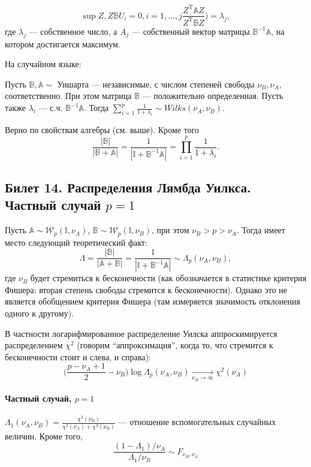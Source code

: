 %
\begin{equation*}
\sup \limits{Z, Z\mathbb{B}U_i = 0, i = 1,\dots, j}  \frac{Z^{\mathrm{T}}\mathbb{A}Z}{Z^{\mathrm{T}}\mathbb{B}Z} \Big) = \lambda_j,
\end{equation*}
%
где $\lambda_j$ --- собственное число, а $A_j$ --- собственный вектор матрицы $\mathbb{B}^{-1}\mathbb{A}$, на котором достигается максимум.

На случайном языке:
\begin{sug}
Пусть $\mathbb{B}, \mathbb{A} \sim$ Уишарта --- независимые, с числом степеней свободы $\nu_B, \nu_A$, соответственно. При этом матрица $\mathbb{B}$ --- положительно определенная. Пусть также $\lambda_i$ --- с.ч. $\mathbb{B}^{-1}\mathbb{A}$. 
Тогда $\sum \limits_{i = 1}^p \frac{1}{1 + \lambda_i} \sim Wilks(\nu_A, \nu_B)$.
\end{sug}
Верно по свойствам алгебры (см. выше). Кроме того
\begin{equation*}
\frac{|\mathbb{B}|}{|\mathbb{B} + \mathbb{A}|} = \frac{1}{|\mathbb{I} + \mathbb{B}^{-1}\mathbb{A}|} = \prod \limits_{i = 1}^p \frac{1}{1 + \lambda_i}.
\end{equation*}

\subsection{Билет 14. Распределения Лямбда Уилкса. Частный случай $p=1$}
Пусть $\mathbb{A} \sim \mathcal{W}_p (\mathbb{I},\nu_A)$, $\mathbb{B} \sim \mathcal{W}_p (\mathbb{I}, \nu_B)$, при этом $\nu_B > p > \nu_A$.
Тогда имеет место следующий теоретический факт:
%
\begin{equation*}
\Lambda = \frac{|\mathbb{B}|}{|\mathbb{A} + \mathbb{B}|} =\frac{1}{|\mathbb{I} + \mathbb{B}^{-1}\mathbb{A}|} \sim \Lambda_p (\nu_A, \nu_B),
\end{equation*}
%
где $\nu_B$ будет стремиться к бесконечности (как обозначается в статистике критерия Фишера: вторая степень свободы стремится к бесконечности). Однако это не является обобщением критерия Фишера (там измеряется значимость отклонения одного к другому).

В частности логарифмированное распределение Уилска аппроскимируется распределением $\chi^2$ (говорим ``аппроксимация'', когда то, что стремится к бесконечности стоит и слева, и справа):
\begin{equation*}
\Big ( \frac{p - \nu_A + 1}{2} - \nu_B \Big )\log \Lambda_p (\nu_A, \nu_B) \underset{\nu_B \rightarrow \infty}{\longrightarrow} \chi^2(\nu_A)
\end{equation*}

\paragraph{Частный случай, $p = 1$}

$\Lambda_1 (\nu_A,\nu_B) = \frac{\chi^2(\nu_B)}{\chi^2(\nu_A)+\chi^2(\nu_B)}$ --- отношение вспомогательных случайных величин. Кроме того,
\begin{equation*}
\frac{(1 - \Lambda_1) / \nu_A}{\Lambda_1 / \nu_B} \sim F_{\nu_B,\nu_A}
\end{equation*}
